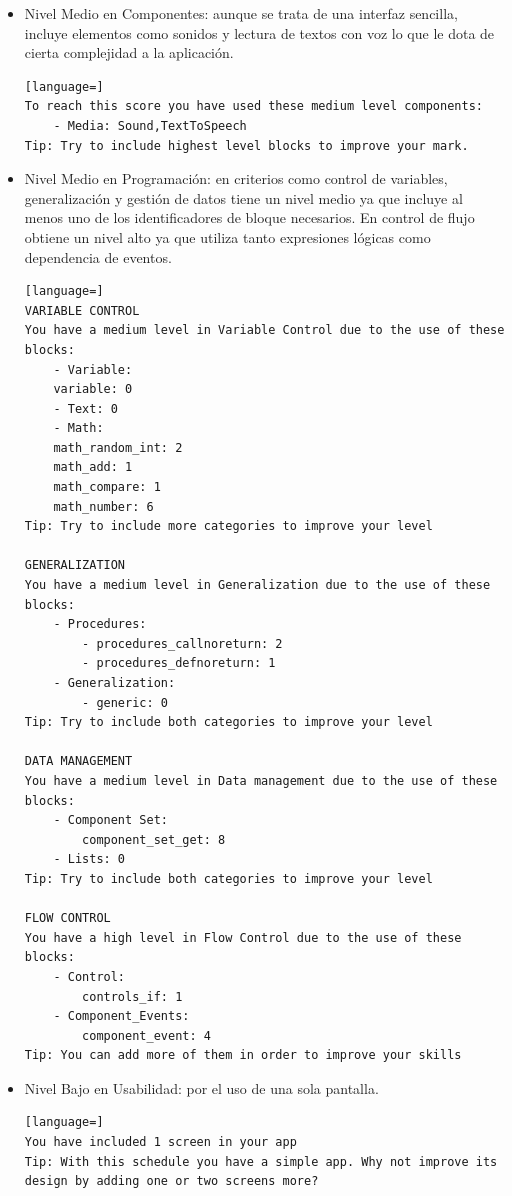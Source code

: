 \documentclass[a4paper, 12pt]{book}
\begin{document}
\begin{itemize}
  \item Nivel Medio en Componentes: aunque se trata de una interfaz sencilla, incluye elementos como sonidos y lectura de textos con voz lo que le dota de cierta complejidad a la aplicación.
\begin{lstlisting}[language=]
To reach this score you have used these medium level components:
    - Media: Sound,TextToSpeech
Tip: Try to include highest level blocks to improve your mark.
\end{lstlisting}
  \item Nivel Medio en Programación: en criterios como control de variables, generalización y gestión de datos tiene un nivel medio ya que incluye al menos uno de los identificadores de bloque necesarios. En control de flujo obtiene un nivel alto ya que utiliza tanto expresiones lógicas como dependencia de eventos. 
\begin{lstlisting}[language=]
VARIABLE CONTROL
You have a medium level in Variable Control due to the use of these blocks:
    - Variable:
	variable: 0
    - Text: 0
    - Math:
	math_random_int: 2
	math_add: 1
	math_compare: 1
	math_number: 6
Tip: Try to include more categories to improve your level

GENERALIZATION
You have a medium level in Generalization due to the use of these blocks:
    - Procedures:
        - procedures_callnoreturn: 2
        - procedures_defnoreturn: 1
    - Generalization:
        - generic: 0
Tip: Try to include both categories to improve your level

DATA MANAGEMENT
You have a medium level in Data management due to the use of these blocks:
    - Component Set:
        component_set_get: 8
    - Lists: 0
Tip: Try to include both categories to improve your level

FLOW CONTROL 
You have a high level in Flow Control due to the use of these blocks:
    - Control:
        controls_if: 1
    - Component_Events:
        component_event: 4
Tip: You can add more of them in order to improve your skills
\end{lstlisting}
  \item Nivel Bajo en Usabilidad: por el uso de una sola pantalla.
\begin{lstlisting}[language=]
You have included 1 screen in your app
Tip: With this schedule you have a simple app. Why not improve its design by adding one or two screens more? 
\end{lstlisting}
\end{itemize}
\end{document}
